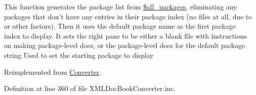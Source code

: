 \-This function generates the package list from \hyperlink{class_converter_a2239e82b48c3085715b2bade1d08779c}{\$all\-\_\-packages}, eliminating any packages that don't have any entries in their package index (no files at all, due to  or other factors). \-Then it uses the default package name as the first package index to display. \-It sets the right pane to be either a blank file with instructions on making package-\/level docs, or the package-\/level docs for the default package.  string \-Used to set the starting package to display 

\-Reimplemented from \hyperlink{class_converter_a963f73984fad30cb1776cd293eeb7db7}{\-Converter}.



\-Definition at line 360 of file \-X\-M\-L\-Doc\-Book\-Converter.\-inc.


